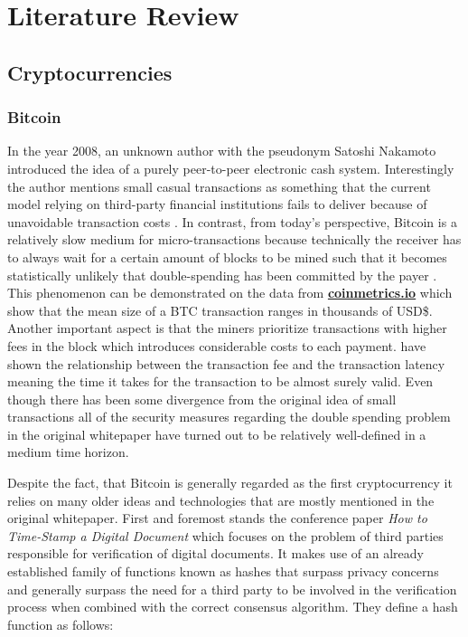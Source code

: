 \chapter{Literature Review}
\label{chap:two}


\section{Cryptocurrencies}
\label{sec:crypto}

\subsection{Bitcoin}
In the year 2008, an unknown author with the pseudonym Satoshi Nakamoto introduced the idea of 
a purely peer-to-peer electronic cash system. Interestingly the author mentions 
small casual transactions as something that the current model relying on third-party
financial institutions fails to deliver because of unavoidable transaction costs \cite{Nakamoto2008}. 
In contrast, from today's perspective, Bitcoin is a relatively slow medium for micro-transactions because 
technically the receiver has to always wait for a certain amount of blocks to be mined such that
it becomes statistically unlikely that double-spending has been committed by the payer 
\cite{Conti2018}. This phenomenon
can be demonstrated on the data from \textbf{\href{https://coinmetrics.io/}{coinmetrics.io}} which show
that the mean size of a \ac{BTC} transaction ranges in thousands of USD\$. 
Another important aspect is that 
the miners prioritize transactions with higher fees in the block which introduces considerable costs
to each payment. \cite{Moeser2015} have shown the relationship between the transaction fee 
and the transaction latency meaning the time it takes for the transaction to be almost surely valid.
Even though 
there has been some divergence from the original idea of small transactions all of the security measures
regarding the double spending problem in the original whitepaper have turned out to be relatively 
well-defined in a medium time horizon.


Despite the fact, that Bitcoin is generally regarded as the first cryptocurrency it relies on 
many older ideas and technologies that are mostly mentioned in the original whitepaper. First and foremost
stands the conference paper \textit{How to Time-Stamp a Digital Document} \cite{Haber1991} which focuses
on the problem of third parties responsible for verification of digital documents. It makes use of 
an already established family of functions known as hashes that surpass privacy concerns and generally
surpass the need for a third party to be involved in the verification process when combined
with the correct consensus algorithm. They define a hash function as follows:

